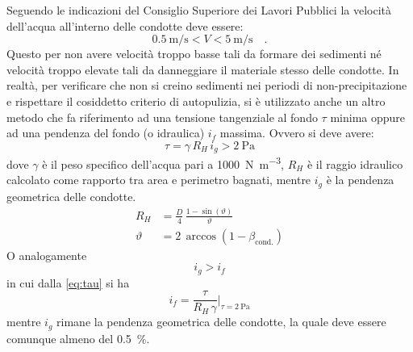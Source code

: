 Seguendo le indicazioni del Consiglio Superiore dei Lavori Pubblici la velocità dell'acqua all'interno delle condotte deve essere:
\begin{equation}
    \SI{0.5}{\metre\per\second} < V <  \SI{5}{\metre\per\second} \quad .
\end{equation}
Questo per non avere velocità troppo basse tali da formare dei sedimenti né velocità troppo elevate tali da danneggiare il materiale stesso delle condotte.
In realtà, per verificare che non si creino sedimenti nei periodi di non-precipitazione e rispettare il cosiddetto criterio di autopulizia, si è utilizzato anche un altro metodo che fa riferimento ad una tensione tangenziale al fondo $\tau$ minima oppure ad una pendenza del fondo (o idraulica) $i_f$ massima. 
Ovvero si deve avere:
\begin{equation}
    \label{eq:tau}
    \tau = \gamma \, R_H \, i_g > \SI{2}{\pascal}
\end{equation}
dove $\gamma$ è il peso specifico dell'acqua pari a \SI{1000}{\newton\per\metre\cubed}, $R_H$ è il raggio idraulico calcolato come rapporto tra area e perimetro bagnati, mentre $i_g$ è la pendenza geometrica delle condotte.  
\begin{align}
    R_H &= \frac{D}{4} \, \frac{1 - \sin(\vartheta)}{\vartheta} \\
    \vartheta &= 2 \, \arccos(1 - \beta_\text{cond.})
\end{align}
O analogamente
\begin{equation}
    i_g > i_f  
\end{equation}
in cui dalla \ref{eq:tau} si ha 
\begin{equation}
    i_f = \frac{\tau}{R_H \, \gamma} \biggr|_{\tau=\SI{2}{\pascal}}
\end{equation}    
mentre $i_g$ rimane la pendenza geometrica delle condotte, la quale deve essere comunque almeno del \SI{0.5}{\percent}.






